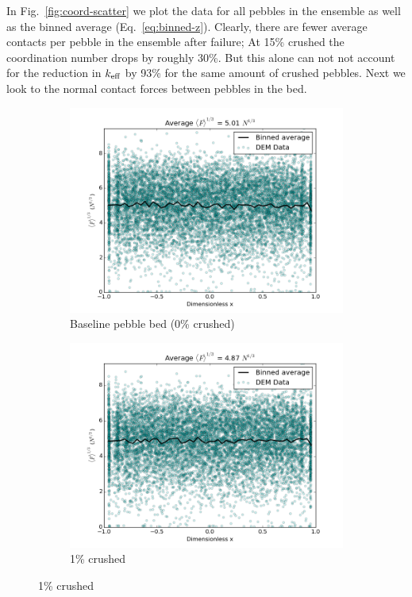 In Fig.~\ref{fig:coord-scatter} we plot the data for all pebbles in the ensemble as well as the binned average (Eq.~\ref{eq:binned-z}). Clearly, there are fewer average contacts per pebble in the ensemble after failure; At 15\% crushed the coordination number drops by roughly 30\%. But this alone can not not account for the reduction in $k_\text{eff}$ by 93\% for the same amount of crushed pebbles. Next we look to the normal contact forces between pebbles in the bed.


\begin{figure}[!ht]
	\centering
	\begin{subfigure}[b]{0.4\textwidth}
		\centering
		\includegraphics[width=\textwidth]{chapters/figures/heating_dte-02/0/dump/force-profile.png}
		\caption{Baseline pebble bed (0\% crushed)}
	\end{subfigure}
	\begin{subfigure}[b]{0.4\textwidth}
		\centering
		\includegraphics[width=\textwidth]{chapters/figures/heating_dte-02/1/dump/force-profile.png}
		\caption{1\% crushed}
	\end{subfigure}
	

\end{figure}
